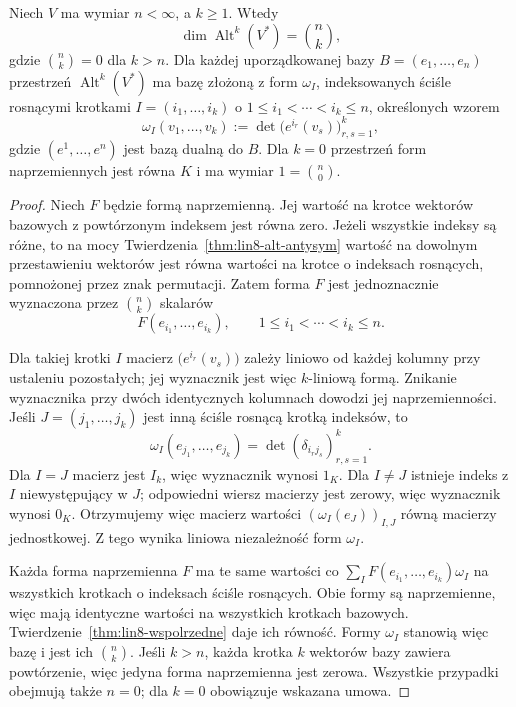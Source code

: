 \begin{twierdzenie}
\label{thm:lin8-wymiar-alt}
Niech \(V\) ma wymiar \(n<\infty\),
a \(k\geq1\).
Wtedy
\[
 \dim\operatorname{Alt}^k(V^*)=\binom{n}{k},
\]
gdzie \(\binom{n}{k}=0\) dla \(k>n\).
Dla każdej uporządkowanej bazy
\(B=(e_1,\ldots,e_n)\) przestrzeń
\(\operatorname{Alt}^k(V^*)\)
ma bazę złożoną z form
\(\omega_I\), indeksowanych
ściśle rosnącymi krotkami
\(I=(i_1,\ldots,i_k)\)
o \(1\leq i_1<\cdots<i_k\leq n\),
określonych wzorem
\[
 \omega_I(v_1,\ldots,v_k)
 :=\det\bigl(e^{i_r}(v_s)\bigr)_{r,s=1}^{k},
\]
gdzie \((e^1,\ldots,e^n)\)
jest bazą dualną do \(B\).
Dla \(k=0\) przestrzeń form
naprzemiennych jest równa \(K\)
i ma wymiar \(1=\binom{n}{0}\).
\end{twierdzenie}
\begin{proof}
Niech \(F\) będzie formą naprzemienną.
Jej wartość na krotce wektorów bazowych
z powtórzonym indeksem jest równa zero.
Jeżeli wszystkie indeksy są różne,
to na mocy
Twierdzenia~\ref{thm:lin8-alt-antysym}
wartość na dowolnym przestawieniu
wektorów jest równa wartości
na krotce o indeksach rosnących,
pomnożonej przez znak permutacji.
Zatem forma \(F\) jest jednoznacznie
wyznaczona przez
\(\binom{n}{k}\) skalarów
\[
 F(e_{i_1},\ldots,e_{i_k}),
 \qquad 1\leq i_1<\cdots<i_k\leq n.
\]

Dla takiej krotki \(I\)
macierz \(\bigl(e^{i_r}(v_s)\bigr)\)
zależy liniowo od każdej kolumny
przy ustaleniu pozostałych;
jej wyznacznik jest więc
\(k\)-liniową formą.
Znikanie wyznacznika przy
dwóch identycznych kolumnach
dowodzi jej naprzemienności.
Jeśli \(J=(j_1,\ldots,j_k)\)
jest inną ściśle rosnącą
krotką indeksów, to
\[
 \omega_I(e_{j_1},\ldots,e_{j_k})
 =\det(\delta_{i_rj_s})_{r,s=1}^k.
\]
Dla \(I=J\) macierz jest \(I_k\),
więc wyznacznik wynosi \(1_K\).
Dla \(I\ne J\) istnieje indeks
z \(I\) niewystępujący w \(J\);
odpowiedni wiersz macierzy
jest zerowy, więc wyznacznik
wynosi \(0_K\).
Otrzymujemy więc macierz
wartości \((\omega_I(e_J))_{I,J}\)
równą macierzy jednostkowej.
Z tego wynika liniowa niezależność
form \(\omega_I\).

Każda forma naprzemienna \(F\)
ma te same wartości co
\(\sum_I F(e_{i_1},\ldots,e_{i_k})\omega_I\)
na wszystkich krotkach
o indeksach ściśle rosnących.
Obie formy są naprzemienne,
więc mają identyczne wartości
na wszystkich krotkach bazowych.
Twierdzenie~\ref{thm:lin8-wspolrzedne}
daje ich równość.
Formy \(\omega_I\) stanowią
więc bazę i jest ich
\(\binom{n}{k}\).
Jeśli \(k>n\), każda krotka
\(k\) wektorów bazy zawiera
powtórzenie, więc
jedyna forma naprzemienna
jest zerowa.
Wszystkie przypadki obejmują
także \(n=0\); dla \(k=0\)
obowiązuje wskazana umowa.
\end{proof}

